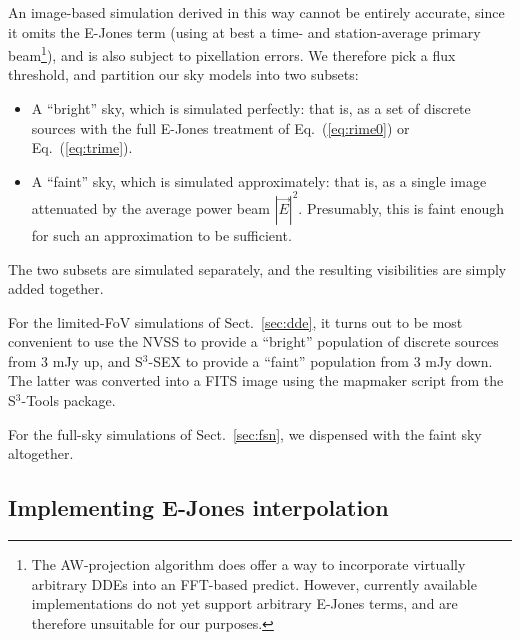 \documentclass{aa}
\begin{document}
An image-based simulation derived in this way cannot be entirely accurate, since it omits the E-Jones term (using at best a time- and station-average primary beam\footnote{The AW-projection algorithm \citep{SB:imageplane} does offer a way to incorporate virtually arbitrary DDEs into an FFT-based predict. However, currently available implementations do not yet support arbitrary E-Jones terms, and are therefore unsuitable for our purposes.}), and is also subject to pixellation errors. We therefore pick a flux threshold, and partition our sky models into two subsets:

\begin{itemize}
  \item A ``bright'' sky, which is simulated perfectly: that is, as a set of discrete sources with the full E-Jones treatment of Eq.~(\ref{eq:rime0}) or Eq.~(\ref{eq:trime}).
  \item A ``faint'' sky, which is simulated approximately: that is, as a single image attenuated by the average power beam $|\vec E|^2$. Presumably, this is faint enough for such an approximation to be sufficient.
\end{itemize}

The two subsets are simulated separately, and the resulting visibilities are simply added together.

For the limited-FoV simulations of Sect.~\ref{sec:dde}, it turns out to be most convenient to use the NVSS to provide a ``bright'' population of discrete sources from 3 mJy up, and S$^3$-SEX to provide a ``faint'' population from 3 mJy down. The latter was converted into a FITS image using the mapmaker script from the S$^3$-Tools package. 

For the full-sky simulations of Sect.~\ref{sec:fsn}, we dispensed with the faint sky altogether.

\subsection{Implementing E-Jones interpolation}
\end{document}

